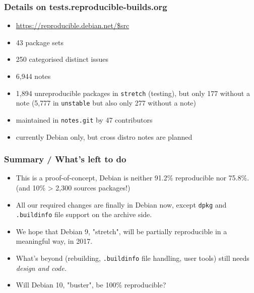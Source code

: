 \documentclass[14pt,aspectratio=169]{beamer}
\begin{document}
\begin{frame}
 \frametitle{Details on tests.reproducible-builds.org}

 \begin{itemize}
  \item \url{https://reproducible.debian.net/$src}
  \item 43 package sets 
  \item 250 categorised distinct issues
  \item 6,944 notes
  \item 1,894 unreproducible packages in \texttt{stretch} (testing), but only
  177 without a note (5,777 in \texttt{unstable} but also only 277 without a
  note)
  \item maintained in \texttt{notes.git} by 47 contributors
  \item currently Debian only, but cross distro notes are planned
 \end{itemize}
\end{frame}


\begin{frame}
 \frametitle{Summary / What's left to do}
 \begin{itemize}
  \item This is a proof-of-concept, Debian is neither 91.2\% reproducible nor
  75.8\%. (and 10\% > 2,300 sources packages!)
  \item<2-4> All our required changes are finally in Debian now, except
  \texttt{dpkg} and \texttt{.buildinfo} file support on the archive side.
  \item<3-4> We hope that Debian 9, "stretch", will be partially reproducible
  in a meaningful way, in 2017.
  \item<3-4> What's beyond (rebuilding, \texttt{.buildinfo} file handling, user
  tools) still needs \it{design} and code.
  \item<4> Will Debian 10, "buster", be 100\% reproducible?
 \end{itemize}
\end{frame}
\end{document}
